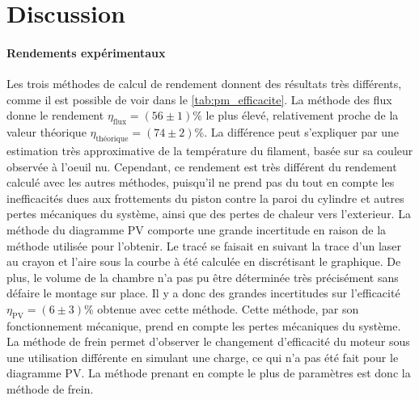 \section{Discussion}

\paragraph*{Rendements expérimentaux}
Les trois méthodes de calcul de rendement donnent des résultats très différents, comme il est possible de voir dans le \autoref{tab:pm_efficacite}. La méthode des flux donne le rendement \(\eta_\textrm{flux} = (56 \pm 1)\)\% le plus élevé, relativement proche de la valeur théorique \(\eta_\textrm{théorique} = (74 \pm 2)\)\%. La différence peut s'expliquer par une estimation très approximative de la température du filament, basée sur sa couleur observée à l'oeuil nu. Cependant, ce rendement est très différent du rendement calculé avec les autres méthodes, puisqu'il ne prend pas du tout en compte les inefficacités dues aux frottements du piston contre la paroi du cylindre et autres pertes mécaniques du système, ainsi que des pertes de chaleur vers l'exterieur. La méthode du diagramme PV comporte une grande incertitude en raison de la méthode utilisée pour l'obtenir. Le tracé se faisait en suivant la trace d'un laser au crayon et l'aire sous la courbe à été calculée en discrétisant le graphique. De plus, le volume de la chambre n'a pas pu être déterminée très précisément sans défaire le montage sur place. Il y a donc des grandes incertitudes sur l'efficacité \(\eta_\textrm{PV} = (6 \pm 3)\)\% obtenue avec cette méthode. Cette méthode, par son fonctionnement mécanique, prend en compte les pertes mécaniques du système. La méthode de frein permet d'observer le changement d'efficacité du moteur sous une utilisation différente en simulant une charge, ce qui n'a pas été fait pour le diagramme PV. La méthode prenant en compte le plus de paramètres est donc la méthode de frein.

